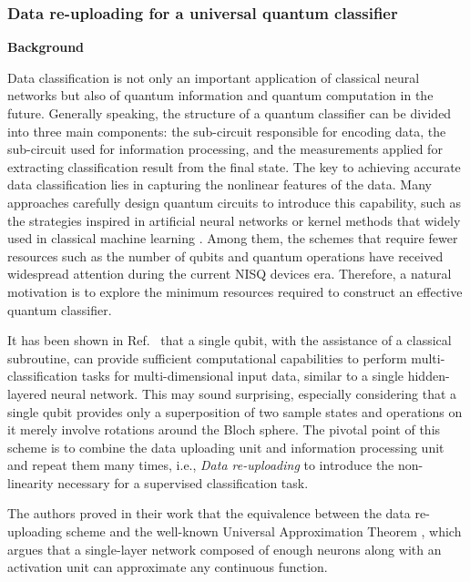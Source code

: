 
\subsubsection{Data re-uploading for a universal quantum classifier}
\textbf{Background}


Data classification is not only an important application of classical neural networks but also of quantum information and quantum computation in the future. Generally speaking, the structure of a quantum classifier can be divided into three main components: the sub-circuit responsible for encoding data, the sub-circuit used for information processing, and the measurements applied for extracting classification result from the final state. 
The key to achieving accurate data classification lies in capturing the nonlinear features of the data. Many approaches carefully design quantum circuits to introduce this capability, such as the strategies inspired in artificial neural networks or kernel methods that widely used in classical machine learning \cite{PhysRevLett.122.040504, 2019Supervised_nature, Wan_2017_npjqi, hur2022quantum, chalumuri2021hybrid, oh2020tutorial, farhi2018classification, wrobel2021application}. Among them, the schemes that require fewer resources such as the number of qubits and quantum operations have received widespread attention during the current NISQ devices era.
Therefore, a natural motivation is to explore the minimum resources required to construct an effective quantum classifier.

It has been shown in Ref.~\cite{PerezSalinas2020datareuploading} that a single qubit, with the assistance of a classical subroutine, can provide sufficient computational capabilities to perform multi-classification tasks for multi-dimensional input data, similar to a single hidden-layered neural network. This may sound surprising, especially considering that a single qubit provides only a superposition of two sample states and operations on it merely involve rotations around the Bloch sphere. 
The pivotal point of this scheme is to combine the data uploading unit and information processing unit and repeat them many times, i.e., \textit{Data re-uploading} to introduce the non-linearity necessary for a supervised classification task. 

The authors proved in their work that the equivalence between the data re-uploading scheme and the well-known Universal Approximation Theorem \cite{HORNIK1991251}, which argues that a single-layer network composed of enough neurons along with an activation unit can approximate any continuous function.

